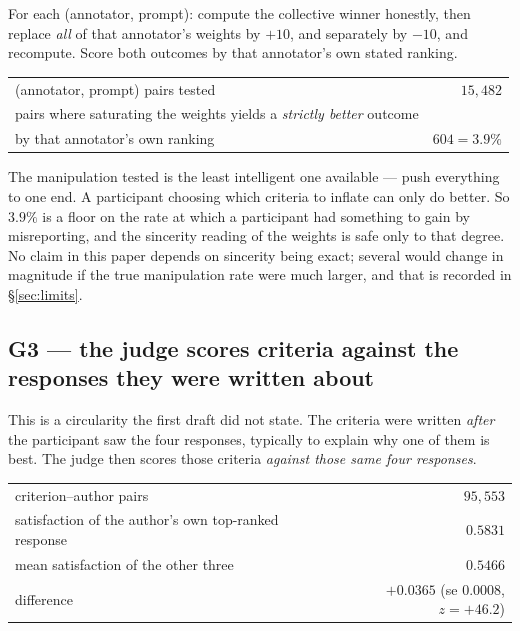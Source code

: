 \begin{protocol}
For each (annotator, prompt): compute the collective winner honestly, then
replace \emph{all} of that annotator's weights by $+10$, and separately by $-10$,
and recompute. Score both outcomes by that annotator's own stated ranking.
\end{protocol}

\begin{table}[H]\centering\small
\begin{tabular}{lr}
\toprule
(annotator, prompt) pairs tested & $15{,}482$\\
pairs where saturating the weights yields a \emph{strictly better} outcome & \\
\quad by that annotator's own ranking & $604 = \mathbf{3.9\%}$\\
\bottomrule
\end{tabular}
\end{table}

\begin{remark}
The manipulation tested is the least intelligent one available --- push everything
to one end. A participant choosing which criteria to inflate can only do better.
So $3.9\%$ is a floor on the rate at which a participant had something to gain by
misreporting, and the sincerity reading of the weights is safe only to that
degree. No claim in this paper depends on sincerity being exact; several would
change in magnitude if the true manipulation rate were much larger, and that is
recorded in §\ref{sec:limits}.
\end{remark}

\subsection{G3 --- the judge scores criteria against the responses they were written about}

This is a circularity the first draft did not state. The criteria were written
\emph{after} the participant saw the four responses, typically to explain why one
of them is best. The judge then scores those criteria \emph{against those same
four responses}.

\begin{table}[H]\centering\small
\begin{tabular}{lr}
\toprule
criterion--author pairs & $95{,}553$\\
satisfaction of the author's own top-ranked response & $0.5831$\\
mean satisfaction of the other three & $0.5466$\\
difference & $+0.0365$ (se $0.0008$, $z=+46.2$)\\
\bottomrule
\end{tabular}
\end{table}


